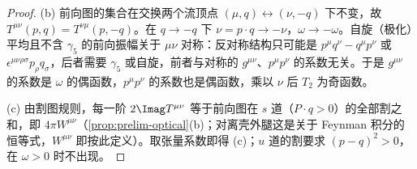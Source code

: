 \begin{proof}
(b) 前向图的集合在交换两个流顶点 $(\mu,q)\leftrightarrow(\nu,-q)$ 下不变，故 $T^{\mu\nu}(p,q)=T^{\nu\mu}(p,-q)$。在 $q\to-q$ 下 $\nu=p\cdot q\to-\nu$，$\omega\to-\omega$。自旋（极化）平均且不含 $\gamma_5$ 的前向振幅关于 $\mu\nu$ 对称：反对称结构只可能是 $p^\mu q^\nu-q^\mu p^\nu$ 或 $\epsilon^{\mu\nu\rho\sigma}p_\rho q_\sigma$，后者需要 $\gamma_5$ 或自旋，前者与对称的 $g^{\mu\nu}$、$p^\mu p^\nu$ 的系数无关。于是 $g^{\mu\nu}$ 的系数是 $\omega$ 的偶函数，$p^\mu p^\nu$ 的系数也是偶函数，乘以 $\nu$ 后 $T_2$ 为奇函数。

(c) 由割图规则，每一阶 $2\Imag T^{\mu\nu}$ 等于前向图在 $s$ 道（$P\cdot q>0$）的全部割之和，即 $4\pi W^{\mu\nu}$（\cref{prop:prelim-optical}(b)；对离壳外腿这是关于 Feynman 积分的恒等式，$W^{\mu\nu}$ 即按此定义）。取张量系数即得 (c)；$u$ 道的割要求 $(p-q)^2>0$，在 $\omega>0$ 时不出现。


\end{proof}
